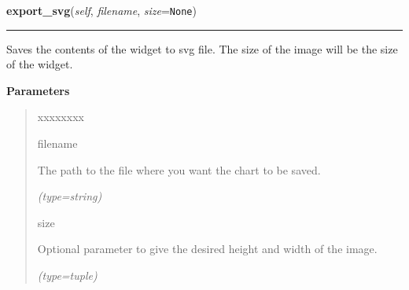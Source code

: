 \hspace{.8\funcindent}\begin{boxedminipage}{\funcwidth}

    \raggedright \textbf{export\_svg}(\textit{self}, \textit{filename}, \textit{size}={\tt None})

    \vspace{-1.5ex}

    \rule{\textwidth}{0.5\fboxrule}
\setlength{\parskip}{2ex}
    Saves the contents of the widget to svg file. The size of the image 
    will be the size of the widget.

\setlength{\parskip}{1ex}
      \textbf{Parameters}
      \vspace{-1ex}

      \begin{quote}
        \begin{Ventry}{xxxxxxxx}

          \item[filename]

          The path to the file where you want the chart to be saved.

            {\it (type=string)}

          \item[size]

          Optional parameter to give the desired height and width of the 
          image.

            {\it (type=tuple)}

        \end{Ventry}

      \end{quote}

    \end{boxedminipage}

    \label{pygtk_chart:chart:Chart:export_png}

    \vspace{0.5ex}

